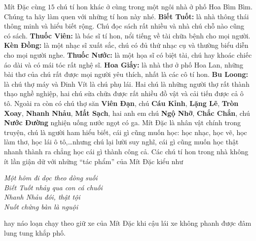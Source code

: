 	Mít Đặc cùng $15$ chú tí hon khác ở cùng trong một ngôi nhà ở phố Hoa Bìm Bìm. Chúng ta hãy làm quen với những tí hon này nhé.
	\vskip 0.1cm
	\textbf{\color{toancuabi}Biết Tuốt:} là nhà thông thái thông minh và hiểu biết rộng. Chú đọc sách rất nhiều và nhà chú chỗ nào cũng có sách.
	\vskip 0.1cm
	\textbf{\color{toancuabi}Thuốc Viên:} là bác sĩ tí hon, nổi tiếng về tài chữa bệnh cho mọi người.
	\vskip 0.1cm
	\textbf{\color{toancuabi}Kèn Đồng:} là một nhạc sĩ xuất sắc, chú có đủ thứ nhạc cụ và thường biểu diễn cho mọi người nghe.
	\vskip 0.1cm
	\textbf{\color{toancuabi}Thuốc Nước:} là một họa sĩ có biệt tài, chú hay khoác chiếc áo dài và có mái tóc rất nghệ sĩ.
	\vskip 0.1cm
	\textbf{\color{toancuabi}Hoa Giấy:} là nhà thơ ở phố Hoa Lan, những bài thơ của chú rất được mọi người yêu thích, nhất là các cô tí hon.
	\vskip 0.1cm
	\textbf{\color{toancuabi}Bu Loong:} là chú thợ máy và Đinh Vít là chú phụ lái. Hai chú là những người thợ rất thành thạo nghề nghiệp, hai chú sửa chữa được rất nhiều đồ vật và cải tiến được cả ô tô.
	\vskip 0.1cm
	Ngoài ra còn có chú thợ săn \textbf{\color{toancuabi}Viên Đạn}, chú \textbf{\color{toancuabi}Cáu Kỉnh}, \textbf{\color{toancuabi}Lặng Lẽ}, \textbf{\color{toancuabi}Tròn Xoay}, \textbf{\color{toancuabi}Nhanh Nhảu}, \textbf{\color{toancuabi}Mất Sạch}, hai anh em chú \textbf{\color{toancuabi}Ngộ Nhỡ}, \textbf{\color{toancuabi}Chắc Chắn}, chú \textbf{\color{toancuabi}Nước Đường} nghiện uống nước ngọt có ga.
	\vskip 0.1cm
	Mít Đặc là nhân vật chính trong truyện, chú là người ham hiểu biết, cái gì cũng muốn học: học nhạc, học vẽ, học làm thơ, học lái ô tô,\ldots \linebreak nhưng chú lại lười suy nghĩ, cái gì cũng muốn học thật nhanh thành ra chẳng học cái gì thành công cả.
	\vskip 0.1cm
	Các chú tí hon trong nhà không ít lần giận dữ với những “tác phẩm” của Mít Đặc kiểu như
	\vskip 0.1cm
	\begin{adjustwidth}{100pt}{0pt}
		\begin{flushleft}
			\textit{Một hôm đi dọc theo dòng suối\\
				Biết Tuốt nhảy qua con cá chuối\\
				Nhanh Nhảu đói, thật tội\\
				Nuốt chửng bàn là nguội}
		\end{flushleft}
	\end{adjustwidth}
	\vskip 0.1cm
	hay náo loạn chạy theo giữ xe của Mít Đặc khi cậu lái xe không phanh được đâm lung tung khắp phố.
